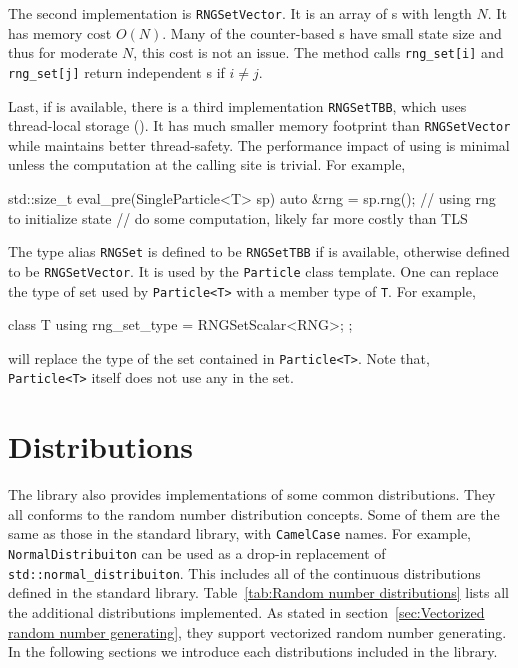 The second implementation is \verb|RNGSetVector|. It is an array of \rng{}s
with length $N$. It has memory cost $O(N)$. Many of the counter-based \rng{}s
have small state size and thus for moderate $N$, this cost is not an issue. The
method calls \verb|rng_set[i]| and \verb|rng_set[j]| return independent \rng{}s
if $i \ne j$.

Last, if \tbb is available, there is a third implementation \verb|RNGSetTBB|,
which uses thread-local storage (\tls). It has much smaller memory footprint
than \verb|RNGSetVector| while maintains better thread-safety. The performance
impact of using \tls is minimal unless the computation at the calling site is
trivial. For example,
\begin{cppcode}
  std::size_t eval_pre(SingleParticle<T> sp)
  {
      auto &rng = sp.rng();
      // using rng to initialize state
      // do some computation, likely far more costly than TLS
  }
\end{cppcode}
The type alias \verb|RNGSet| is defined to be \verb|RNGSetTBB| if \tbb is
available, otherwise defined to be \verb|RNGSetVector|. It is used by the
\verb|Particle| class template. One can replace the type of \rng set used by
\verb|Particle<T>| with a member type of \verb|T|. For example,
\begin{cppcode}
  class T
  {
      using rng_set_type = RNGSetScalar<RNG>;
  };
\end{cppcode}
will replace the type of the \rng set contained in \verb|Particle<T>|. Note
that, \verb|Particle<T>| itself does not use any \rng in the set.

\section{Distributions}
\label{sec:Distributions}

The library also provides implementations of some common distributions. They
all conforms to the \cppoo random number distribution concepts. Some of them
are the same as those in the \cppoo standard library, with \verb|CamelCase|
names. For example, \verb|NormalDistribuiton| can be used as a drop-in
replacement of \verb|std::normal_distribuiton|. This includes all of the
continuous distributions defined in the standard library.
Table~\ref{tab:Random number distributions} lists all the additional
distributions implemented. As stated in section~\ref{sec:Vectorized random
  number generating}, they support vectorized random number generating. In the
following sections we introduce each distributions included in the library.

